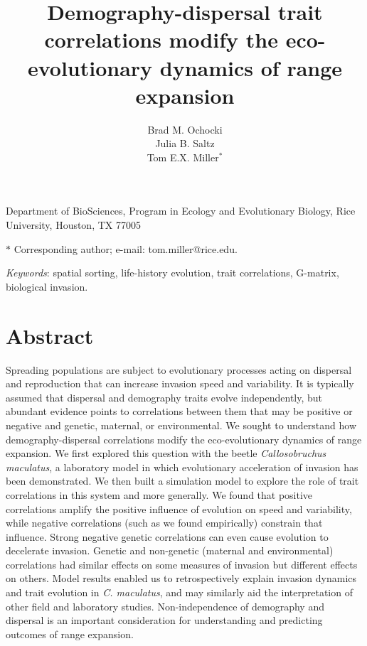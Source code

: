 \documentclass[11pt]{article}
\title{Demography-dispersal trait correlations modify the eco-evolutionary dynamics of range expansion}
\author{Brad M. Ochocki \\
Julia B. Saltz \\
Tom E.X. Miller$^{\ast}$}
\date{}
\begin{document}
\maketitle

\noindent{} Department of BioSciences, Program in Ecology and Evolutionary Biology, Rice University, Houston, TX 77005

\noindent{} $\ast$ Corresponding author; e-mail: tom.miller@rice.edu.

\bigskip

\noindent{} \textit{Keywords}: spatial sorting, life-history evolution, trait correlations, G-matrix, biological invasion.

\newpage{}

\section*{Abstract}
Spreading populations are subject to evolutionary processes acting on dispersal and reproduction that can increase invasion speed and variability. It is typically assumed that dispersal and demography traits evolve independently, but abundant evidence points to correlations between them that may be positive or negative and genetic, maternal, or  environmental. We sought to understand how demography-dispersal correlations modify the eco-evolutionary dynamics of range expansion. We first explored this question with the beetle \textit{Callosobruchus maculatus}, a laboratory model in which evolutionary acceleration of invasion has been demonstrated. We then built a simulation model to explore the role of trait correlations in this system and more generally. We found that positive correlations amplify the positive influence of evolution on speed and variability, while negative correlations (such as we found empirically) constrain that influence. Strong negative genetic correlations can even cause evolution to decelerate invasion. Genetic and non-genetic (maternal and environmental) correlations had similar effects on some measures of invasion but different effects on others. Model results enabled us to retrospectively explain invasion dynamics and trait evolution in \textit{C. maculatus}, and may similarly aid the interpretation of other field and laboratory studies. Non-independence of demography and dispersal is an important consideration for understanding and predicting outcomes of range expansion.


\newpage{}
\end{document}
